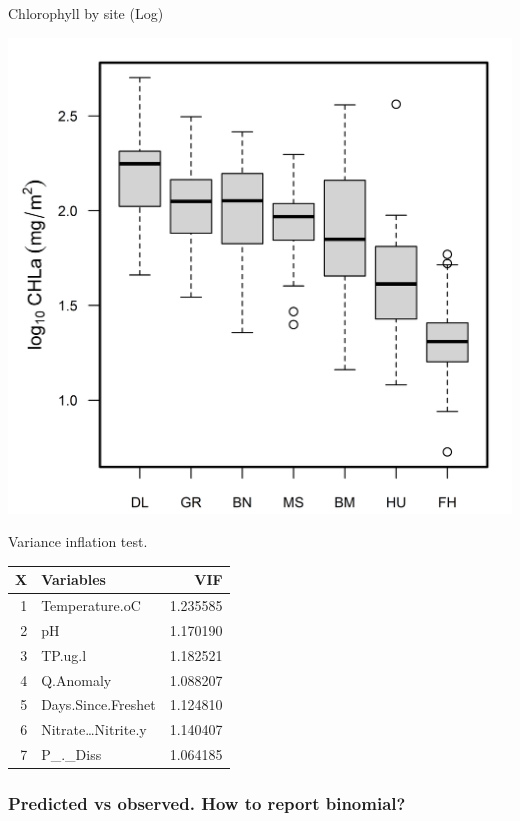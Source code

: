 \documentclass[
]{article}
\let\origfigure\figure
\let\endorigfigure\endfigure
\renewenvironment{figure}[1][2] {
    \expandafter\origfigure\expandafter[H]
} {
    \endorigfigure
}
\begin{document}
Chlorophyll by site (Log)

\begin{figure}

{\centering \includegraphics[width=1\linewidth]{Manuscript_files/FIGURES/Chla_Boxplots} 

}

\caption{A caption}\label{fig:unnamed-chunk-1}
\end{figure}

Variance inflation test.

\begin{longtable}[]{@{}rlr@{}}
\toprule()
X & Variables & VIF \\
\midrule()
\endhead
1 & Temperature.oC & 1.235585 \\
2 & pH & 1.170190 \\
3 & TP.ug.l & 1.182521 \\
4 & Q.Anomaly & 1.088207 \\
5 & Days.Since.Freshet & 1.124810 \\
6 & Nitrate\ldots Nitrite.y & 1.140407 \\
7 & P\_.\_Diss & 1.064185 \\
\bottomrule()
\end{longtable}

\hypertarget{predicted-vs-observed.-how-to-report-binomial}{%
\subsubsection{Predicted vs observed. How to report
binomial?}\label{predicted-vs-observed.-how-to-report-binomial}}
\end{document}
